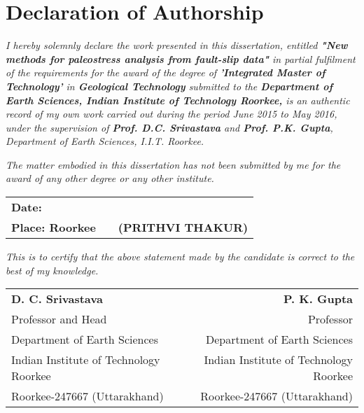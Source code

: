 \documentclass[12pt, oneside]{book}
\author{Prithvi Thakur}
\date{2015-16}
\begin{document}


\frontmatter

\chapter{Declaration of Authorship}
 \textit{I hereby solemnly declare the work presented in this dissertation, entitled \textbf{"New methods for paleostress analysis from fault-slip data"} in partial fulfilment of the requirements for the award of the degree of \textbf{'Integrated Master of Technology'} in \textbf{Geological Technology} submitted to the \textbf{Department of Earth Sciences, Indian Institute of Technology Roorkee,} is an authentic record of my own work carried out during the period June 2015 to May 2016, under the supervision of \textbf{Prof. D.C. Srivastava} and \textbf{Prof. P.K. Gupta}, Department of Earth Sciences, I.I.T. Roorkee.}
 
 \textit{The matter embodied in this dissertation has not been submitted by me for the award of any other degree or any other institute.}

\vspace{1cm}
    
\begin{tabular}{l l r}
    \textbf{Date:} & & \\
    \textbf{Place: Roorkee} &\hspace{5.1cm} & \textbf{(PRITHVI THAKUR)} 
\end{tabular}

\hrulefill %

\textit{This is to certify that the above statement made by the candidate is correct to the best of my knowledge.}

\small
\begin{flushleft}
\vspace{0.5cm}
\begin{tabular}{l r}
\textbf{D. C. Srivastava} & \hspace{1cm} \textbf{P. K. Gupta} \\
Professor and Head & \hspace{1cm} Professor \\
Department of Earth Sciences & \hspace{1cm} Department of Earth Sciences \\
Indian Institute of Technology Roorkee & \hspace{1cm} Indian Institute of Technology Roorkee \\
Roorkee-247667 (Uttarakhand) & \hspace{1cm} Roorkee-247667 (Uttarakhand) \\
\end{tabular}
\end{flushleft}
\end{document}
